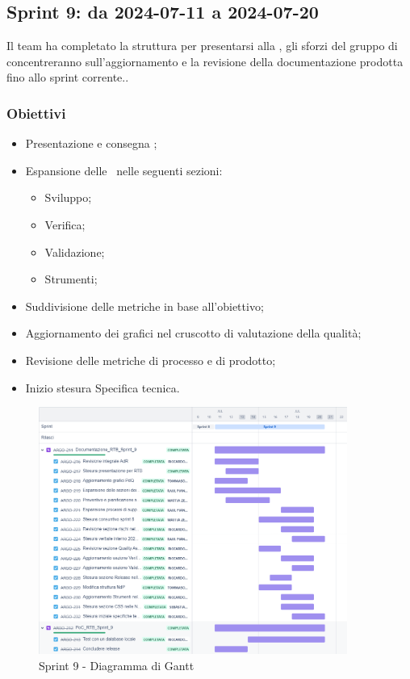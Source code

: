 \subsection{Sprint 9: da 2024-07-11 a 2024-07-20}
\par Il team ha completato la struttura per presentarsi alla , gli sforzi del gruppo di concentreranno sull’aggiornamento e la revisione della documentazione prodotta fino allo sprint corrente..

\subsubsection{Obiettivi}
\begin{itemize}
  \item Presentazione e consegna ;
  \item Espansione delle \NdP\ nelle seguenti sezioni:
  \begin{itemize}
    \item Sviluppo;
    \item Verifica;
    \item Validazione;
    \item Strumenti;
  \end{itemize}
  \item Suddivisione delle metriche in base all’obiettivo;
  \item Aggiornamento dei grafici nel cruscotto di valutazione della qualità;
  \item Revisione delle metriche di processo e di prodotto;
  \item Inizio stesura Specifica tecnica.
\end{itemize}

\begin{figure}[H]
  \centering
  \includegraphics[width=0.90\textwidth]{assets/Pianificazione/Sprint-9/gantt.png}
  \caption{Sprint 9 - Diagramma di Gantt}\label{fig:sprint-9-gantt}
\end{figure}

